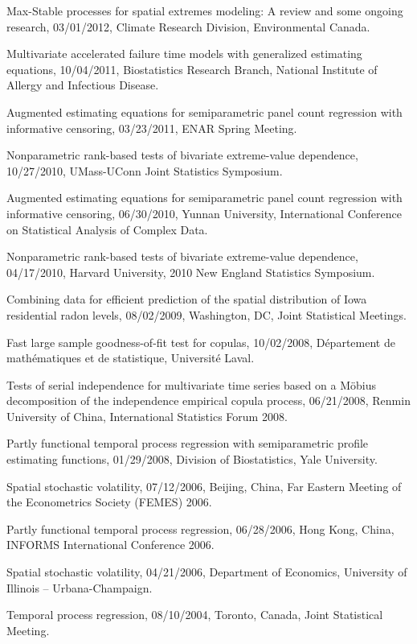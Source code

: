 \documentclass[Statistics]{vita}
\begin{document}
\begin{vita}
\begin{InvitedTalks}
  \item Max-Stable processes for spatial extremes modeling: A review and some ongoing research, 03/01/2012, Climate Research Division, Environmental Canada.
  \item Multivariate accelerated failure time models with generalized estimating equations, 10/04/2011, Biostatistics Research Branch, National Institute of Allergy and Infectious Disease.
  \item Augmented estimating equations for semiparametric panel count regression with informative censoring, 03/23/2011, ENAR Spring Meeting.
  \item Nonparametric rank-based tests of bivariate extreme-value dependence, 10/27/2010, UMass-UConn Joint Statistics Symposium.
  \item Augmented estimating equations for semiparametric panel count regression with informative censoring, 06/30/2010, Yunnan University, International Conference on Statistical Analysis of Complex Data.
  \item Nonparametric rank-based tests of bivariate extreme-value dependence, 04/17/2010, Harvard University, 2010 New England Statistics Symposium.
  \item Combining data for efficient prediction of the spatial distribution of Iowa residential radon levels, 08/02/2009, Washington, DC, Joint Statistical Meetings.
  \item Fast large sample goodness-of-fit test for copulas, 10/02/2008, D\'epartement de math\'ematiques et de statistique, Universit\'e Laval.
  \item Tests of serial independence for multivariate time series based on a M\"obius decomposition of the independence empirical copula process, 06/21/2008, Renmin University of China, International Statistics Forum 2008.
  \item Partly functional temporal process regression with semiparametric profile estimating functions, 01/29/2008, Division of Biostatistics, Yale University.
  \item Spatial stochastic volatility, 07/12/2006, Beijing, China, Far Eastern Meeting of the Econometrics Society (FEMES) 2006.
  \item Partly functional temporal process regression, 06/28/2006, Hong Kong, China, INFORMS International Conference 2006.
  \item Spatial stochastic volatility, 04/21/2006, Department of Economics, University of Illinois -- Urbana-Champaign.
  \item Temporal process regression, 08/10/2004, Toronto, Canada, Joint Statistical Meeting.

\end{InvitedTalks}
\end{vita}
\end{document}

